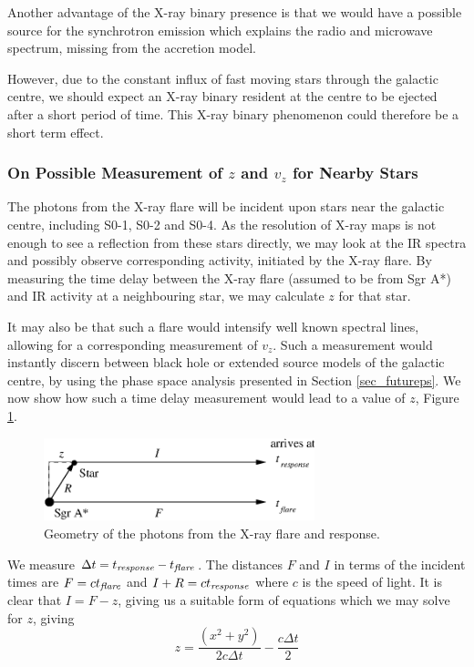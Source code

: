 Another advantage of the X-ray binary presence is that we would have a possible source for the synchrotron emission which explains the
radio and microwave spectrum, missing from the accretion model.

However, due to the constant influx of fast moving stars through the galactic centre, we should expect an X-ray binary resident
at the centre to be ejected after a short period of time. This X-ray binary phenomenon could therefore be a short term effect.

\subsubsection{On Possible Measurement of $z$ and $v_z$ for Nearby Stars}
\label{sec_zandvz}
The photons from the X-ray flare will be incident upon stars near the galactic centre, including S0-1, S0-2 and S0-4. As the
resolution of X-ray maps is not enough to see a reflection from these stars directly, we may look at the IR spectra
and possibly observe corresponding activity, initiated by the X-ray flare. By measuring the time delay between the X-ray
flare (assumed to be from Sgr A*) and IR activity at a neighbouring star, we may calculate $z$ for that star.

It may also be that such a flare would intensify well known spectral lines, allowing for a corresponding measurement of $v_z$.
Such a measurement would instantly discern between black hole or extended source models of the galactic centre, by
using the phase space analysis presented in Section \ref{sec_futureps}.
We now show how such a time delay measurement would lead to a value of $z$, Figure \ref{fig_geomfindzvz}.
\begin{figure}[!h]
	\begin{center}
	\includegraphics[angle=0,width=0.7\textwidth]{eps/zmeasure.eps}
	\caption{Geometry of the photons from the X-ray flare and response.}
	\label{fig_geomfindzvz}
	\end{center}
\end{figure}

\noindent
We measure $\Delta t=t_{{\rm {\it response}}}-t_{{\rm {\it flare}}}$. The distances $F$ and $I$ in terms of the incident times are
$F=ct_{{\rm {\it flare}}}$ and $I+R=ct_{{\rm {\it response}}}$ where $c$ is the speed of light. It is clear that $I=F-z$, giving us
a suitable form of equations which we may solve for $z$, giving
\begin{equation}
	z=\frac{\left(x^2+y^2\right)}{2c\Delta t} -\frac{c\Delta t}{2}
\end{equation}

